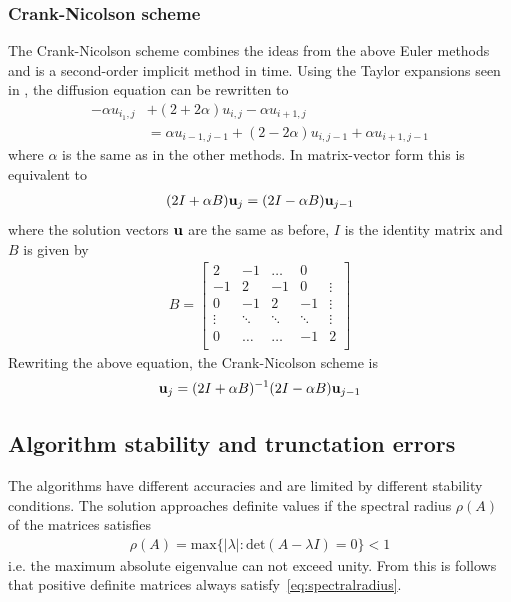 \documentclass[aps,reprint]{revtex4-1}
\begin{document}
\subsubsection{Crank-Nicolson scheme}
The Crank-Nicolson scheme combines the ideas from the above Euler methods and is
a second-order implicit method in time. Using the Taylor expansions seen in
\cite{mortenjensen}, the diffusion equation can be rewritten to
\begin{align*}
  -\alpha u_{i_1, j} &+ (2 + 2\alpha) u_{i,j} - \alpha u_{i+1,j}\\
   &= \alpha u_{i-1,j-1} + (2 - 2\alpha) u_{i, j-1} + \alpha u_{i+1,j-1}
\end{align*}
where $\alpha$ is the same as in the other methods. In matrix-vector form this
is equivalent to
\begin{align*}
  (2 I + \alpha B) \vb{u}_j = (2 I - \alpha B) \vb{u}_{j-1}
\end{align*}
where the solution vectors $\vb{u}$ are the same as before, $I$ is the identity
matrix and $B$ is given by
\begin{align*}
  B = \begin{bmatrix}
        2  & -1 & \hdots  & 0      \\
        -1 & 2  & -1 & 0       & \vdots \\
        0  & -1 & 2  & -1  & \vdots \\
        \vdots       & \ddots      & \ddots       & \ddots  & \vdots \\
        0  & \hdots  & \hdots       & -1  & 2 \\
      \end{bmatrix}
\end{align*}
Rewriting the above equation, the Crank-Nicolson scheme is
\begin{align*}
  \vb{u}_j = (2 I + \alpha B)^{-1} (2 I - \alpha B) \vb{u}_{j-1}
\end{align*}
\subsection{Algorithm stability and trunctation errors}
The algorithms have different accuracies and are limited by different stability
conditions. The solution approaches definite values if the spectral radius $\rho(A)$ of
the matrices satisfies
\begin{align} \label{eq:spectralradius}
  \rho(A) = \text{max}\{ |\lambda| : \text{det}(A - \lambda I) = 0 \} < 1
\end{align}
i.e. the maximum absolute eigenvalue can not exceed unity. From this is follows
that positive definite matrices always satisfy~\ref{eq:spectralradius}.
\end{document}
